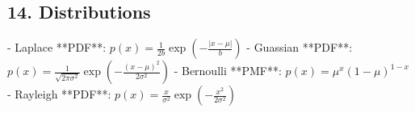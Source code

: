 \documentclass[10pt]{article}
\begin{document}
\begin{multicols}{2}
\section*{14. Distributions}

- Laplace **PDF**: $p(x) = \frac{1}{2b} \exp\left(-\frac{|x-\mu|}{b}\right)$
- Guassian **PDF**: $p(x) = \frac{1}{\sqrt{2\pi\sigma^2}} \exp\left(-\frac{(x-\mu)^2}{2\sigma^2}\right)$
- Bernoulli **PMF**: $p(x) = \mu^x(1-\mu)^{1-x}$
- Rayleigh **PDF**: $p(x) = \frac{x}{\sigma^2} \exp\left(-\frac{x^2}{2\sigma^2}\right)$
\end{multicols}
\end{document}
